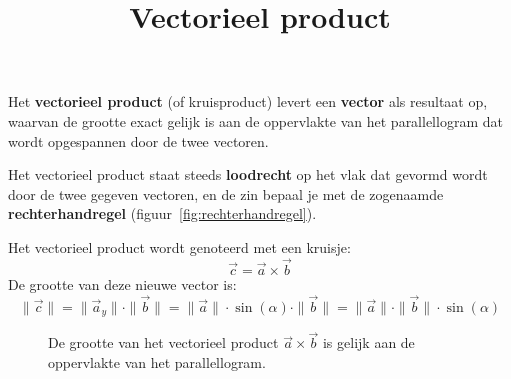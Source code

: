 \documentclass{ximera}
\title{Vectorieel product}
\begin{document}
\begin{abstract}
\end{abstract}
\maketitle


Het \textbf{vectorieel product} (of kruisproduct) levert een \textbf{vector} als resultaat op, waarvan de grootte exact gelijk is aan de oppervlakte van het parallellogram dat wordt opgespannen door de twee vectoren. 

Het vectorieel product staat steeds \textbf{loodrecht} op het vlak dat gevormd wordt door de twee gegeven vectoren, en de zin bepaal je met de zogenaamde \textbf{rechterhandregel} (figuur~\ref{fig:rechterhandregel}).

Het vectorieel product wordt genoteerd met een kruisje:
\[ \vec{c} = \vec{a} \times \vec{b} \]
De grootte van deze nieuwe vector is:
\[ \|\vec{c}\| = \| \vec{a}_y \| \cdot \|\vec{b}\| = \|\vec{a}\| \cdot \sin(\alpha) \cdot \|\vec{b}\| = \| \vec{a}\| \cdot \| \vec{b}\| \cdot \sin(\alpha) \]

\begin{figure}[ht!]
    \captionsetup{width=0.85\textwidth}
    \begin{center}
    \end{center}
    \caption{De grootte van het vectorieel product $\vec{a} \times \vec{b}$ is gelijk aan de oppervlakte van het parallellogram.}
    \label{fig:vectorieel_product}
\end{figure}
\end{document}
